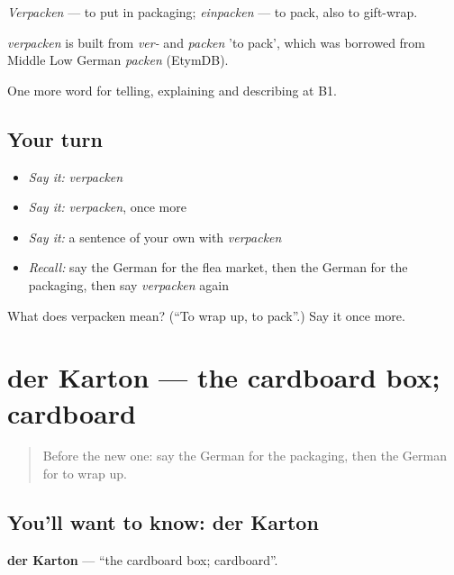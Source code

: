 \emph{Verpacken} — to put in packaging; \emph{einpacken} — to pack, also to gift-wrap.

\begin{cousinweb}
\emph{verpacken} is built from \emph{ver-} and \emph{packen} 'to pack', which was borrowed from Middle Low German \emph{packen} (EtymDB).
\end{cousinweb}

\begin{grammarlens}[title={What you've built}]
One more word for telling, explaining and describing at B1.
\end{grammarlens}

\subsection*{Your turn}
\begin{itemize}
\raggedright
  \item \emph{Say it:} \emph{verpacken}
  \item \emph{Say it:} \emph{verpacken}, once more
  \item \emph{Say it:} a sentence of your own with \emph{verpacken}
  \item \emph{Recall:} say the German for the flea market, then the German for the packaging, then say \emph{verpacken} again
\end{itemize}

\begin{tcolorbox}[breakable,colback=teal!4,colframe=teal!35!black,title={Before you move on}]
What does verpacken mean? (\textquotedblleft{}To wrap up, to pack\textquotedblright{}.) Say it once more.
\end{tcolorbox}
\section[der Karton]{der Karton — the cardboard box; cardboard}

\label{lesson:GE-C452-karton}



\begin{quote}
Before the new one: say the German for the packaging, then the German for to wrap up.
\end{quote}

\subsection*{You'll want to know: der Karton}
\textbf{der Karton} — \textquotedblleft{}the cardboard box; cardboard\textquotedblright{}.

